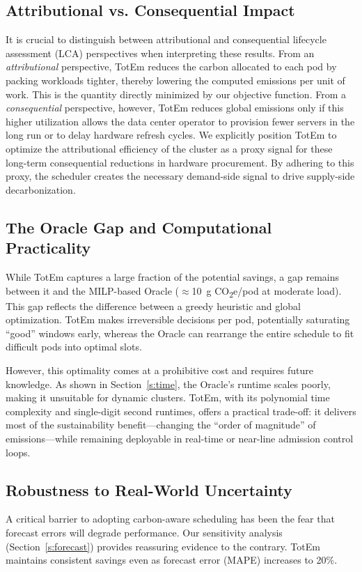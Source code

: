 \documentclass[10pt,journal,compsoc]{IEEEtran}
\begin{document}
\subsection{Attributional vs. Consequential Impact}
It is crucial to distinguish between attributional and consequential lifecycle assessment (LCA) perspectives when interpreting these results. From an \emph{attributional} perspective, TotEm reduces the carbon allocated to each pod by packing workloads tighter, thereby lowering the computed emissions per unit of work. This is the quantity directly minimized by our objective function. From a \emph{consequential} perspective, however, TotEm reduces global emissions only if this higher utilization allows the data center operator to provision fewer servers in the long run or to delay hardware refresh cycles. We explicitly position TotEm to optimize the attributional efficiency of the cluster as a proxy signal for these long-term consequential reductions in hardware procurement. By adhering to this proxy, the scheduler creates the necessary demand-side signal to drive supply-side decarbonization.

\subsection{The Oracle Gap and Computational Practicality}
While TotEm captures a large fraction of the potential savings, a gap remains between it and the MILP-based Oracle ($\approx$10~g CO\textsubscript{2}e/pod at moderate load). This gap reflects the difference between a greedy heuristic and global optimization. TotEm makes irreversible decisions per pod, potentially saturating ``good'' windows early, whereas the Oracle can rearrange the entire schedule to fit difficult pods into optimal slots.

However, this optimality comes at a prohibitive cost and requires future knowledge. As shown in Section~\ref{s:time}, the Oracle's runtime scales poorly, making it unsuitable for dynamic clusters. TotEm, with its polynomial time complexity and single-digit second runtimes, offers a practical trade-off: it delivers most of the sustainability benefit—changing the ``order of magnitude'' of emissions—while remaining deployable in real-time or near-line admission control loops.

\subsection{Robustness to Real-World Uncertainty}
A critical barrier to adopting carbon-aware scheduling has been the fear that forecast errors will degrade performance. Our sensitivity analysis (Section~\ref{s:forecast}) provides reassuring evidence to the contrary. TotEm maintains consistent savings even as forecast error (MAPE) increases to 20\%. 
\end{document}
